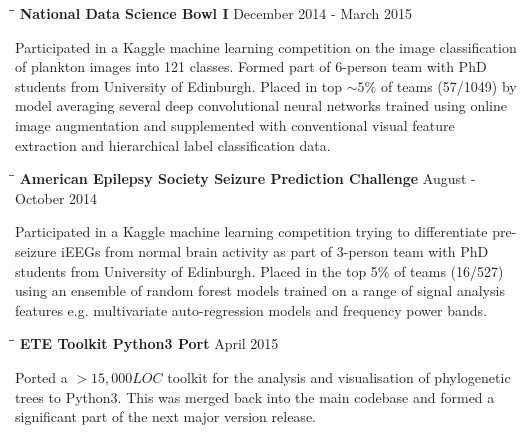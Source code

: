 \documentclass{res}
\begin{document}
\begin{resume}
   \vspace{-0.15in} 
   \begin{tabbing}
   \hspace{2in}\= \hspace{2.6in}\= \kill 
   {\bf National Data Science Bowl I} \> \>        December 2014 - March 2015\\
     \end{tabbing}\vspace{-20pt}      
     Participated in a Kaggle machine learning competition on the image classification of plankton images into 121 classes. Formed part of 6-person team with PhD students from University of Edinburgh. 
     Placed in top $\sim5\%$ of teams (57/1049) by model averaging several deep convolutional neural networks trained using online image augmentation and supplemented with conventional visual feature extraction and hierarchical label classification data.
\pagebreak
   \begin{tabbing}
   \hspace{2in}\= \hspace{2.6in}\= \kill 
   {\bf American Epilepsy Society Seizure Prediction Challenge} \> \>        August - October 2014\\
     \end{tabbing}\vspace{-20pt}      
     Participated in a Kaggle machine learning competition trying to differentiate pre-seizure iEEGs from normal brain activity as part of 3-person team with PhD students from University of Edinburgh. 
     Placed in the top 5\% of teams (16/527) using an ensemble of random forest models trained on a range of signal analysis features e.g. multivariate auto-regression models and frequency power bands.

     \vspace{-0.15in}
   \begin{tabbing}
   \hspace{2in}\= \hspace{2.6in}\= \kill 
    {\bf ETE Toolkit Python3 Port} \> \>        April 2015\\
     \end{tabbing}\vspace{-20pt}      
     Ported a \(>15,000 LOC\) toolkit for the
     analysis and visualisation of phylogenetic trees to Python3.  This was merged back into the main
     codebase and formed a significant part of 
     the next major version release.
   \vspace{-0.1in} 



\end{resume}
\end{document}
